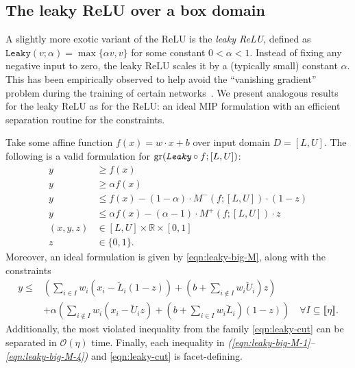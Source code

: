 \documentclass[smallextended]{svjour3}
\newcommand{\bbR}{\mathbb{R}}
\newcommand{\gr}{\operatorname{gr}}
\newcommand{\Leaky}{\texttt{Leaky}}
\begin{document}
\subsection{The leaky ReLU over a box domain}
A slightly more exotic variant of the ReLU is the \emph{leaky ReLU}, defined as $\Leaky{}(v;\alpha) = \max\{\alpha v, v\}$ for some constant $0 < \alpha < 1$. Instead of fixing any negative input to zero, the leaky ReLU scales it by a (typically small) constant $\alpha$. This has been empirically observed to help avoid the ``vanishing gradient'' problem during the training of certain networks~\cite{Maas:2013,Xu:2015b}. We present analogous results for the leaky ReLU as for the ReLU: an ideal MIP formulation with an efficient separation routine for the constraints. %
\begin{proposition} \label{prop:ideal-leaky-relu}
    Take some affine function $f(x) = w \cdot x + b$ over input domain $D = [L,U]$. The following is a valid formulation for $\gr(\emph{\Leaky{}} \circ f; [L,U])$:
    \begin{subequations} \label{eqn:leaky-big-M}
    \begin{align}
        y &\geq f(x) \label{eqn:leaky-big-M-1} \\
        y &\geq \alpha f(x) \label{eqn:leaky-big-M-2} \\
        y &\leq f(x) - (1-\alpha) \cdot M^-(f; [L,U]) \cdot (1-z) \label{eqn:leaky-big-M-3} \\
        y &\leq \alpha f(x) - (\alpha-1) \cdot M^+(f; [L,U]) \cdot z \label{eqn:leaky-big-M-4} \\
        (x,y,z) &\in [L,U] \times \bbR \times [0,1] \\
        z &\in \{0,1\}.
    \end{align}
    \end{subequations}
    Moreover, an ideal formulation is given by \eqref{eqn:leaky-big-M}, along with the constraints
    \begin{align} \label{eqn:leaky-cut}
        y \leq& \left(\sum_{i \in I} w_i(x_i - \breve{L}_i(1-z)) + \left(b + \sum_{i \not\in I} w_i\breve{U}_i\right)z\right) \nonumber \\
        & + \alpha\left(\sum_{i \not\in I} w_i(x_i - \breve{U}_iz) + \left(b + \sum_{i \in I} w_i\breve{L}_i\right)(1-z)\right) \quad \forall I \subseteq \llbracket \eta \rrbracket.
    \end{align}
    Additionally, the most violated inequality from the family \eqref{eqn:leaky-cut} can be separated in $\mathcal{O}(\eta)$ time. Finally, each inequality in \emph{(\ref{eqn:leaky-big-M-1}--\ref{eqn:leaky-big-M-4})} and \eqref{eqn:leaky-cut} is facet-defining.
\end{proposition}
\end{document}
